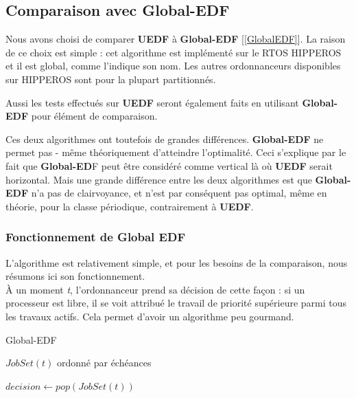 	\newpage
	
	
	
	
	
	
	
	
	
	
	
	
	
	
	
	
	
	\subsection{Comparaison avec Global-EDF}
	
	Nous avons choisi de comparer \textbf{UEDF} à \textbf{Global-EDF} [\ref*{GlobalEDF}]. 
	La raison de ce choix est simple : 
	cet algorithme est implémenté sur le RTOS HIPPEROS et il est global, comme 
	l'indique son nom. 
	Les autres ordonnanceurs disponibles sur HIPPEROS sont pour la plupart partitionnés.
 
	Aussi les tests effectués sur \textbf{UEDF} seront également faits en utilisant \textbf{Global-EDF} pour 
	élément de comparaison.\newline
	
	Ces deux algorithmes ont toutefois de grandes différences. \textbf{Global-EDF}
	ne permet pas - même théoriquement  d'atteindre l'optimalité. Ceci s'explique par le fait que 
	\textbf{Global-ED}F peut être considéré comme \og{}vertical\fg{} là où \textbf{UEDF} serait \og{}horizontal\fg{}. 
	Mais une grande différence entre les deux algorithmes est que \textbf{Global-EDF} n'a pas de clairvoyance, 
	et n'est par conséquent pas optimal, même en théorie, pour la classe périodique, 
	contrairement à \textbf{UEDF}.
	
	\subsubsection{Fonctionnement de Global EDF}
	
	L'algorithme est relativement simple, et pour les besoins de la comparaison, nous résumons 
	ici son fonctionnement.\\
	À un moment \textit{t}, l'ordonnanceur prend sa décision de cette façon :
	si un processeur est libre, il se voit attribué le travail de priorité supérieure parmi 
	tous les travaux actifs. Cela permet d'avoir un algorithme peu gourmand.
	
	\begin{algorithm}
	\caption{Global-EDF}
	\begin{algorithmic}
		\REQUIRE $JobSet(t)$ ordonné par échéances
			\item $decision \leftarrow pop(JobSet(t))$
		\ENDFOR
	\end{algorithmic}
\end{algorithm}	
	
